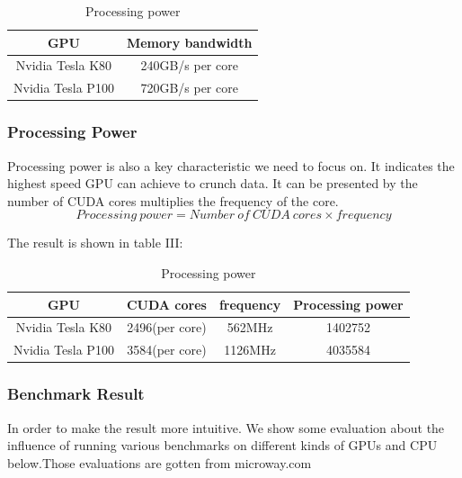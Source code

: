 \documentclass[conference]{IEEEtran}
\begin{document}
\begin{table}[H]
\caption{Processing power}
\begin{center}
\begin{tabular}{|c|c|}
\hline
\textbf{GPU} & \textbf{Memory bandwidth}\\
\hline
Nvidia Tesla K80 & 240GB/s per core \\
\hline
Nvidia Tesla P100 & 720GB/s per core\\
\hline
\end{tabular}
\end{center}
\end{table}




\subsubsection{Processing Power}
Processing power is also a key characteristic we need to focus on. It indicates the highest speed GPU can achieve to crunch data. It can be presented by the number of CUDA cores multiplies the frequency of the core.
$$Processing \ power = Number \ of \ CUDA \ cores \times frequency $$

The result is shown in table III:

\begin{table}[H]
\caption{Processing power}
\begin{center}
\begin{tabular}{|c|c|c|c|}
\hline
\textbf{GPU} & \textbf{CUDA cores}& \textbf{frequency}& \textbf{Processing power} \\
\hline
Nvidia Tesla K80 & 2496(per core)& 562MHz & 1402752 \\
\hline
Nvidia Tesla P100 & 3584(per core)& 1126MHz & 4035584 \\
\hline
\end{tabular}
\label{tab2}
\end{center}
\end{table}

\subsubsection{Benchmark Result}

In order to make the result more intuitive. We show some evaluation about the influence of running various benchmarks on different kinds of GPUs and CPU below.Those evaluations are gotten from microway.com \cite{b5}
\end{document}
